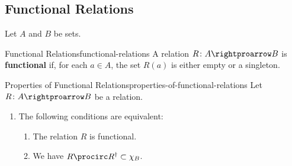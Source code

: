 \subsection{Functional Relations}\label{subsection-functional-relations}
Let $A$ and $B$ be sets.
\begin{definition}{Functional Relations}{functional-relations}%
    A relation $R\colon A\rightproarrow B$ is \textbf{functional} if, for each $a\in A$, the set $R(a)$ is either empty or a singleton.
\end{definition}
\begin{proposition}{Properties of Functional Relations}{properties-of-functional-relations}%
    Let $R\colon A\rightproarrow B$ be a relation.
    \begin{enumerate}
        \item\label{properties-of-functional-relations-characterisations}The following conditions are equivalent:
            \begin{enumerate}
                \item\label{properties-of-functional-relations-characterisations-1}The relation $R$ is functional.
                \item\label{properties-of-functional-relations-characterisations-2}We have $R\procirc R^{\dagger}\subset\chi_{B}$.
            \end{enumerate}
    \end{enumerate}
\end{proposition}
